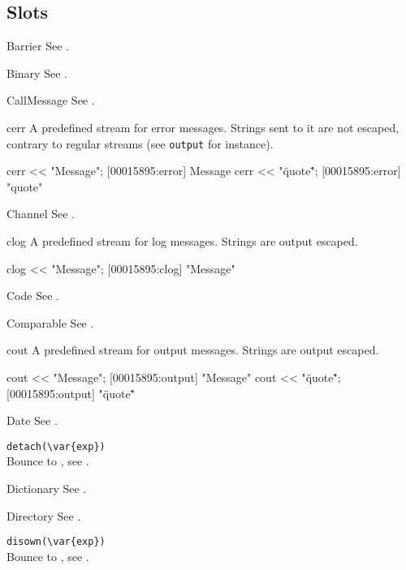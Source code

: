 \subsection{Slots}
\begin{urbiscriptapi}
\item[Barrier] See .
\item[Binary] See .
\item[CallMessage] See .

\item[cerr] A predefined stream for error messages.  Strings sent to
  it are not escaped, contrary to regular streams (see
  \lstinline|output| for instance).
\begin{urbiscript}
cerr << "Message";
[00015895:error] Message
cerr << "\"quote\"";
[00015895:error] "quote"
\end{urbiscript}

\item[Channel] See .

\item[clog] A predefined stream for log messages.  Strings are output
  escaped.
\begin{urbiscript}
clog << "Message";
[00015895:clog] "Message"
\end{urbiscript}

\item[Code] See .
\item[Comparable] See .

\item[cout] A predefined stream for output messages.  Strings are
  output escaped.
\begin{urbiscript}
cout << "Message";
[00015895:output] "Message"
cout << "\"quote\"";
[00015895:output] "\"quote\""
\end{urbiscript}

\item[Date] See .

\item \lstinline|detach(\var{exp})|\\
  Bounce to , see .

\item[Dictionary] See .
\item[Directory] See .

\item \lstinline|disown(\var{exp})|\\
  Bounce to , see .


\end{urbiscriptapi}
